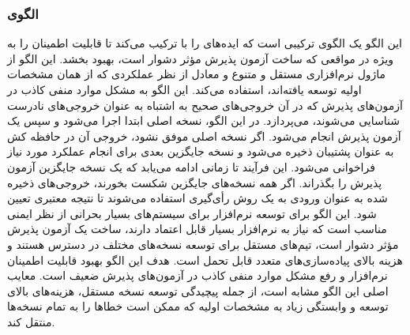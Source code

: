 \subsubsection{الگوی }
\label{ArmoushSWRecoverBlockBackVotSec}
\begin{RTL}
این الگو \cite{ref5}
یک الگوی ترکیبی است که ایده‌های 
را با  ترکیب می‌کند تا قابلیت
اطمینان را به ویژه در مواقعی که ساخت آزمون پذیرش مؤثر
دشوار است، بهبود بخشد. این الگو از  ماژول
نرم‌افزاری مستقل و متنوع و معادل از نظر عملکردی
که از همان مشخصات اولیه توسعه یافته‌اند،
استفاده می‌کند. این الگو به مشکل موارد منفی کاذب در آزمون‌های
پذیرش که در آن خروجی‌های صحیح به اشتباه به عنوان خروجی‌های نادرست
شناسایی می‌شوند، می‌پردازد. در این الگو، نسخه اصلی ابتدا
اجرا می‌شود و سپس یک آزمون پذیرش انجام می‌شود.
اگر نسخه اصلی موفق نشود، خروجی آن در حافظه کش به عنوان
پشتیبان ذخیره می‌شود و نسخه جایگزین بعدی برای انجام عملکرد
مورد نیاز فراخوانی می‌شود. این فرآیند تا زمانی ادامه می‌یابد
که یک نسخه جایگزین آزمون پذیرش را بگذراند. اگر همه نسخه‌های جایگزین
شکست بخورند، خروجی‌های ذخیره شده به عنوان ورودی به یک روش رأی‌گیری
استفاده می‌شوند تا نتیجه معتبری تعیین شود.
این الگو برای توسعه نرم‌افزار برای سیستم‌های بسیار بحرانی از نظر ایمنی مناسب است
که نیاز به نرم‌افزار بسیار قابل اعتماد دارند، ساخت یک آزمون پذیرش
مؤثر دشوار است، تیم‌های مستقل برای توسعه نسخه‌های مختلف در
دسترس هستند و هزینه بالای پیاده‌سازی‌های متعدد قابل تحمل است.
هدف این الگو بهبود قابلیت اطمینان نرم‌افزار و رفع مشکل موارد
منفی کاذب در آزمون‌های پذیرش ضعیف است.
معایب اصلی این الگو مشابه  است،
از جمله پیچیدگی توسعه  نسخه‌ مستقل، هزینه‌های بالای توسعه و
وابستگی زیاد به مشخصات اولیه که ممکن است خطاها
را به تمام نسخه‌ها منتقل کند.
\end{RTL}